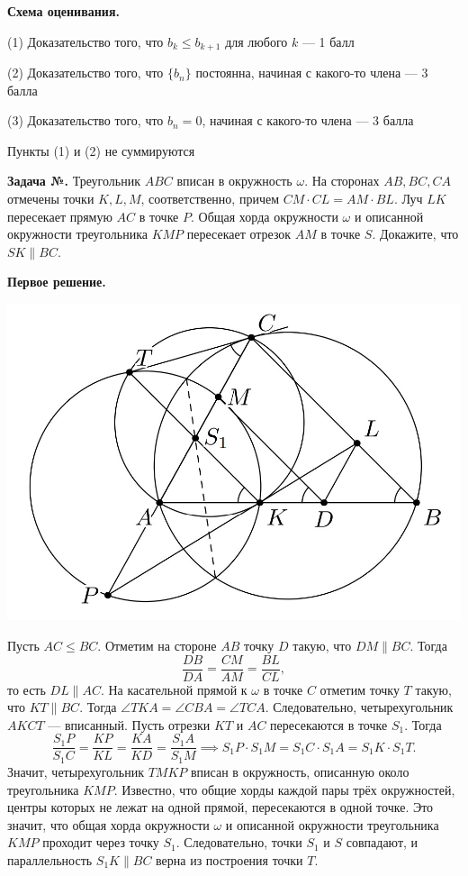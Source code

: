 \documentclass[12pt]{article}
\newcounter{zadacha}
\newcommand{\z}{\par  \smallskip \noindent \refstepcounter{zadacha}%
\textbf{Задача №\arabic{zadacha}.} }
\def\solI{\noindent \textbf{Первое решение. }}
\begin{document}
\bigskip

\textbf{Схема оценивания.}
\begin{compactitem}
\item (1) Доказательство того, что $b_k \leq b_{k+1}$ для любого $k$ --- 1 балл
\item (2) Доказательство того, что $\{b_n\}$ постоянна, начиная с какого-то члена --- 3 балла
\item (3) Доказательство того, что $b_n = 0$, начиная с какого-то члена --- 3 балла
\item Пункты (1) и (2) не суммируются
\end{compactitem}

\bigskip

\z Треугольник $ABC$ вписан в окружность $\omega$. На сторонах $AB, BC, CA$ отмечены точки $K, L, M$, соответственно, причем $CM \cdot CL = AM \cdot BL$. Луч $LK$ пересекает прямую $AC$ в точке $P$.  Общая хорда окружности $\omega$ и описанной окружности треугольника $KMP$ пересекает отрезок $AM$ в точке $S$. Докажите, что $SK \parallel BC$. %

\bigskip

\solI 

\bigskip

{
\centerline {\includegraphics[scale=0.5]{img_1.jpg}}
}

\bigskip

\noindent Пусть $AC \leq BC$. Отметим на стороне $AB$ точку $D$ такую, что $DM \parallel BC$. Тогда 
\[\frac{DB}{DA} = \frac{CM}{AM} = \frac{BL}{CL},\]
то есть $DL \parallel AC$. На касательной прямой к $\omega$ в точке $C$ отметим точку $T$ такую, что $KT \parallel BC$. Тогда $\angle TKA = \angle CBA = \angle TCA$. Следовательно, четырехугольник $AKCT$ --- вписанный. Пусть отрезки $KT$ и $AC$ пересекаются в точке $S_1$. Тогда 
\[\frac{S_1P}{S_1C} = \frac{KP}{KL} = \frac{KA}{KD} = \frac{S_1A}{S_1M} \implies S_1P \cdot S_1M = S_1C \cdot S_1A = S_1K \cdot S_1T.\]
Значит, четырехугольник $TMKP$ вписан в окружность, описанную около треугольника $KMP$. Известно, что общие хорды каждой пары трёх окружностей, центры которых не лежат на одной прямой, пересекаются в одной точке. Это значит, что общая хорда окружности $\omega$ и описанной окружности треугольника $KMP$ проходит через точку $S_1$. Следовательно, точки $S_1$ и $S$ совпадают, и параллельность $S_1K \parallel BC$ верна из построения точки $T$. 
\end{document}
